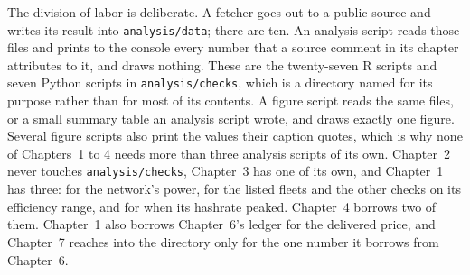 The division of labor is deliberate. A fetcher goes out to a public source and
writes its result into \texttt{analysis/data}; there are ten. An analysis
script reads those files and prints to the console every number that a source comment in its chapter attributes to it, and draws nothing. These are the twenty-seven R
scripts and seven Python scripts in \texttt{analysis/checks}, which is a directory named for its purpose rather than for most of its contents. A figure script reads the same
files, or a small summary table an analysis script wrote, and draws exactly one
figure. Several figure scripts also print the values their caption quotes,
which is why none of Chapters~1 to 4 needs more than three analysis scripts of its own.
Chapter~2 never touches \texttt{analysis/checks}, Chapter~3 has one of its
own, and Chapter~1 has three: for the network's power, for the listed fleets
and the other checks on its efficiency range, and for when its hashrate peaked. Chapter~4
borrows two of them. Chapter~1 also borrows Chapter~6's ledger for the
delivered price, and Chapter~7 reaches into the directory only for the one
number it borrows from Chapter~6. %

